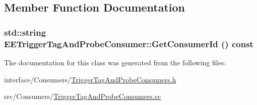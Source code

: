 \subsection{Member Function Documentation}
\hypertarget{classEETriggerTagAndProbeConsumer_aa26ce60c8fa7c674536f627b9000d246}{
\subsubsection[{GetConsumerId}]{\setlength{\rightskip}{0pt plus 5cm}std::string EETriggerTagAndProbeConsumer::GetConsumerId () const}}
\label{classEETriggerTagAndProbeConsumer_aa26ce60c8fa7c674536f627b9000d246}


The documentation for this class was generated from the following files:\begin{DoxyCompactItemize}
\item 
interface/Consumers/\hyperlink{TriggerTagAndProbeConsumers_8h}{TriggerTagAndProbeConsumers.h}\item 
src/Consumers/\hyperlink{TriggerTagAndProbeConsumers_8cc}{TriggerTagAndProbeConsumers.cc}\end{DoxyCompactItemize}
